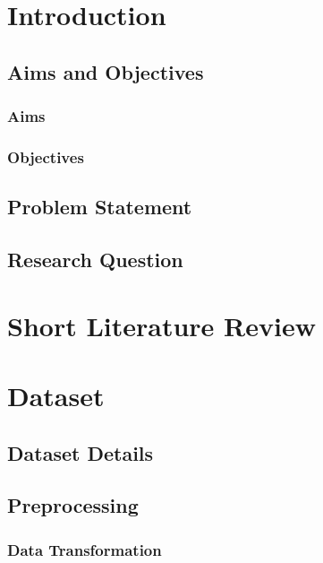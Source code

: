 \documentclass[a4paper,oneside,11pt]{book}
\begin{document}
\MakeTitle 

\tableofcontents

\newpage
\setcounter{page}{2}
\listoffigures

\cleardoublepage 
{} 

\chapter{Introduction}
\section{Aims and Objectives}
\subsection{Aims}
\subsection{Objectives}
\section{Problem Statement}
\section{Research Question}

\chapter{Short Literature Review}

\chapter{Dataset}
\section{Dataset Details}
\section{Preprocessing}
\subsection{Data Transformation}
\end{document}
